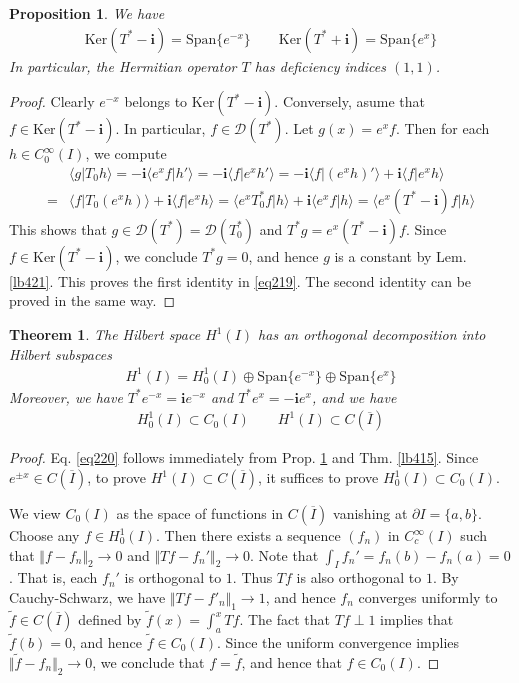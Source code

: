 \documentclass[12pt,b5paper,notitlepage]{article}
\theoremstyle{definition}
\theoremstyle{plain}
\newtheorem{thm}[df]{Theorem}
\newtheorem{pp}[df]{Proposition}
\newcommand{\wtd}{\widetilde}
\newcommand{\ovl}{\overline}
\newcommand{\Dom}{\mathscr{D}}
\newcommand{\Span}{\mathrm{Span}}
\newcommand{\bk}[1]{\langle {#1}\rangle}
\newcommand{\im}{\mathbf{i}}
\newcommand{\Ker}{\mathrm{Ker}}
\numberwithin{equation}{section}
\begin{document}
\begin{pp}\label{lb422}
We have
\begin{align}\label{eq219}
\Ker(T^*-\im)=\Span\{e^{-x}\}\qquad \Ker(T^*+\im)=\Span\{e^{x}\}
\end{align}
In particular, the Hermitian operator $T$ has deficiency indices $(1,1)$.
\end{pp}

\begin{proof}
Clearly $e^{-x}$ belongs to $\Ker(T^*-\im)$. Conversely, asume that $f\in\Ker(T^*-\im)$. In particular, $f\in\Dom(T^*)$. Let $g(x)=e^xf$. Then for each $h\in C_0^\infty(I)$, we compute
\begin{align*}
&\bk{g|T_0h}=-\im\bk{e^xf|h'}=-\im\bk{f|e^xh'}=-\im\bk{f|(e^xh)'}+\im\bk{f|e^xh}\\
=&\bk{f|T_0(e^xh)}+\im\bk{f|e^xh}=\bk{e^xT_0^*f|h}+\im\bk{e^xf|h}=\bk{e^x(T^*-\im)f|h}
\end{align*}
This shows that $g\in\Dom(T^*)=\Dom(T_0^*)$ and $T^*g=e^x(T^*-\im)f$. Since $f\in\Ker(T^*-\im)$, we conclude $T^*g=0$, and hence $g$ is a constant by Lem. \ref{lb421}. This proves the first identity in \eqref{eq219}. The second identity can be proved in the same way.
\end{proof}


\begin{thm}\label{lb423}
The Hilbert space $H^1(I)$ has an orthogonal decomposition into Hilbert subspaces
\begin{align}\label{eq220}
H^1(I)=H^1_0(I)\oplus \Span\{e^{-x}\}\oplus \Span\{e^x\}
\end{align}
Moreover, we have $T^*e^{-x}=\im e^{-x}$ and $T^*e^x=-\im e^x$, and we have
\begin{align}\label{eq221}
H_0^1(I)\subset C_0(I)\qquad H^1(I)\subset C(\ovl I)
\end{align}
\end{thm}



\begin{proof}
Eq. \ref{eq220} follows immediately from Prop. \ref{lb422} and Thm. \ref{lb415}. Since $e^{\pm x}\in C(\ovl I)$, to prove $H^1(I)\subset C(\ovl I)$, it suffices to prove $H_0^1(I)\subset C_0(I)$.

We view $C_0(I)$ as the space of functions in $C(\ovl I)$ vanishing at $\partial I=\{a,b\}$. Choose any $f\in H_0^1(I)$. Then there exists a sequence $(f_n)$ in $C_c^\infty(I)$ such that $\Vert f-f_n\Vert_2\rightarrow0$ and $\Vert Tf-f_n'\Vert_2\rightarrow0$. Note that $\int_I f_n'=f_n(b)-f_n(a)=0$. That is, each $f_n'$ is orthogonal to $1$. Thus $Tf$ is also orthogonal to $1$. By Cauchy-Schwarz, we have $\Vert Tf-f'_n\Vert_1\rightarrow1$, and hence $f_n$ converges uniformly to $\wtd f\in C(\ovl I)$ defined by $\wtd f(x)=\int_a^xTf$. The fact that $Tf\perp 1$ implies that $\wtd f(b)=0$, and hence $\wtd f\in C_0(I)$. Since the uniform convergence implies $\Vert\wtd f-f_n\Vert_2\rightarrow0$, we conclude that $f=\wtd f$, and hence that $f\in C_0(I)$.
\end{proof}
\end{document}
